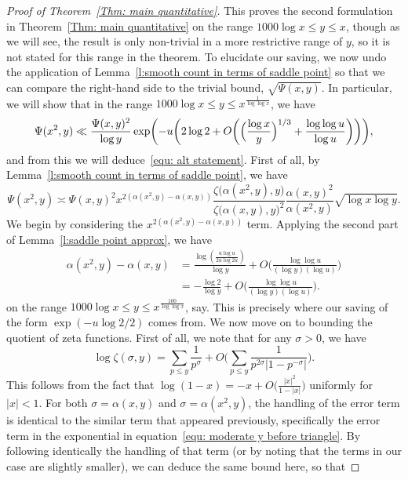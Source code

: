 \documentclass[10pt,a4paper]{amsart}
\def\leq {\leqslant}
\begin{document}
\begin{proof}[Proof of Theorem~\ref{Thm: main quantitative}]
This proves the second formulation in Theorem~\ref{Thm: main quantitative} on the range $1000 \log x \leq y \leq x$, though as we will see, the result is only non-trivial in a more restrictive range of $y$, so it is not stated for this range in the theorem. To elucidate our saving, we now undo the application of Lemma~\ref{l:smooth count in terms of saddle point} so that we can compare the right-hand side to the trivial bound, $\sqrt{\Psi(x,y)}$. In particular, we will show that in the range $1000 \log x \leq y \leq x^{\frac{1}{\log \log x}}$, we have
\[
\Psi (x^2, y) \ll \frac{\Psi(x,y)^2}{\log y} \exp \biggl( - u \biggl( 2 \log 2 + O \biggl( \Bigl( \frac{\log x}{y} \Bigr)^{1/3} + \frac{\log \log u}{\log u} \biggr) \biggr) \biggr),
\]
and from this we will deduce~\eqref{equ: alt statement}. First of all, by Lemma~\ref{l:smooth count in terms of saddle point}, we have
\begin{equation}\label{equ: order of mag comparrison}
\Psi (x^2, y) \asymp \Psi (x,y)^2 x^{2 (\alpha (x^2, y) - \alpha (x,y))} \frac{\zeta \bigl( \alpha (x^2, y), y \bigr)}{\zeta \bigl( \alpha (x,y), y \bigr)^2} \frac{\alpha(x,y)^2}{\alpha(x^2, y)} \sqrt{\log x \log y}.
\end{equation}
We begin by considering the $x^{2 (\alpha (x^2, y) - \alpha (x,y))}$ term. Applying the second part of Lemma~\ref{l:saddle point approx}, we have
\begin{equation}\label{equ:alpha(x^2,y) vs alpha(x,y)}
\begin{split}
\alpha (x^2, y) - \alpha (x,y) &= \frac{\log (\frac{u \log u}{2 u \log 2u})}{\log y} + O \biggl( \frac{\log \log u}{(\log y)(\log u)} \biggr) \\
& = - \frac{\log 2}{\log y} + O \biggl( \frac{\log \log u}{(\log y)(\log u)} \biggr) .
\end{split}
\end{equation}
on the range $1000 \log x \leq y \leq x^{\frac{100}{\log \log x}}$, say. This is precisely where our saving of the form $\exp (- u \log 2 / 2)$ comes from. We now move on to bounding the quotient of zeta functions. First of all, we note that for any $\sigma > 0$, we have
\[
\log \zeta (\sigma, y) = \sum_{p \leq y} \frac{1}{p^{\sigma}} + O \biggl( \sum_{p \leq y} \frac{1}{p^{2 \sigma} |1 - p^{-\sigma}|} \biggr).
\]
This follows from the fact that $\log (1 - x) = - x + O \bigl( \frac{|x|^2}{1 - |x|} \bigr) $ uniformly for $|x| < 1$. For both $\sigma = \alpha (x,y)$ and $\sigma = \alpha (x^2, y)$, the handling of the error term is identical to the similar term that appeared previously, specifically the error term in the exponential in equation~\eqref{equ: moderate y before triangle}. By following identically the handling of that term (or by noting that the terms in our case are slightly smaller), we can deduce the same bound here, so that 

\end{proof}
\end{document}
